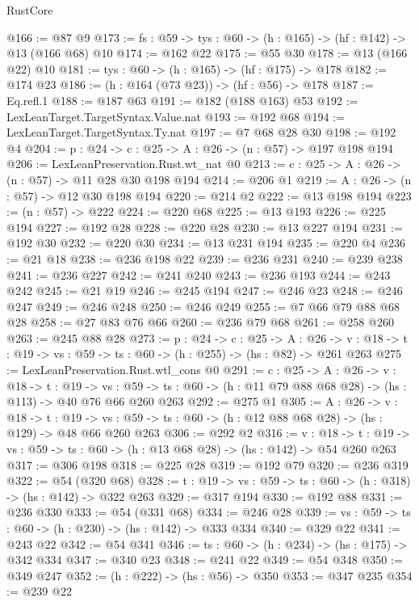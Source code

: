 \begin{lexlean}{RustCore}
\begin{coremodule}
@166 := @87 @9
@173 := {fs : @59} -> {tys : @60} -> (h : @165) -> (hf : @142) -> @13 (@166 @68) @10
@174 := @162 @22
@175 := @55 @30
@178 := @13 (@166 @22) @10
@181 := {tys : @60} -> (h : @165) -> (hf : @175) -> @178
@182 := @174 @23
@186 := (h : @164 (@73 @23)) -> (hf : @56) -> @178
@187 := Eq.refl.{1}
@188 := @187 @63
@191 := @182 (@188 @163) @53
@192 := LexLeanTarget.TargetSyntax.Value.nat
@193 := @192 @68
@194 := LexLeanTarget.TargetSyntax.Ty.nat
@197 := @7 @68 @28 @30
@198 := @192 @4
@204 := {p : @24} -> {c : @25} -> {A : @26} -> (n : @57) -> @197 @198 @194
@206 := LexLeanPreservation.Rust.wt_nat @0
@213 := {c : @25} -> {A : @26} -> (n : @57) -> @11 @28 @30 @198 @194
@214 := @206 @1
@219 := {A : @26} -> (n : @57) -> @12 @30 @198 @194
@220 := @214 @2
@222 := @13 @198 @194
@223 := (n : @57) -> @222
@224 := @220 @68
@225 := @13 @193
@226 := @225 @194
@227 := @192 @28
@228 := @220 @28
@230 := @13 @227 @194
@231 := @192 @30
@232 := @220 @30
@234 := @13 @231 @194
@235 := @220 @4
@236 := @21 @18
@238 := @236 @198 @22
@239 := @236 @231
@240 := @239 @238
@241 := @236 @227
@242 := @241 @240
@243 := @236 @193
@244 := @243 @242
@245 := @21 @19
@246 := @245 @194
@247 := @246 @23
@248 := @246 @247
@249 := @246 @248
@250 := @246 @249
@255 := @7 @66 @79 @88 @68 @28
@258 := @27 @83 @76 @66
@260 := @236 @79 @68
@261 := @258 @260
@263 := @245 @88 @28
@273 := {p : @24} ->
  {c : @25} ->
  {A : @26} ->
  {v : @18} -> {t : @19} -> {vs : @59} -> {ts : @60} -> (h : @255) -> (hs : @82) -> @261 @263
@275 := LexLeanPreservation.Rust.wtl_cons @0
@291 := {c : @25} ->
  {A : @26} ->
  {v : @18} ->
  {t : @19} ->
  {vs : @59} -> {ts : @60} -> (h : @11 @79 @88 @68 @28) -> (hs : @113) -> @40 @76 @66 @260 @263
@292 := @275 @1
@305 := {A : @26} ->
  {v : @18} ->
  {t : @19} -> {vs : @59} -> {ts : @60} -> (h : @12 @88 @68 @28) -> (hs : @129) -> @48 @66 @260 @263
@306 := @292 @2
@316 := {v : @18} ->
  {t : @19} -> {vs : @59} -> {ts : @60} -> (h : @13 @68 @28) -> (hs : @142) -> @54 @260 @263
@317 := @306 @198
@318 := @225 @28
@319 := @192 @79
@320 := @236 @319
@322 := @54 (@320 @68)
@328 := {t : @19} -> {vs : @59} -> {ts : @60} -> (h : @318) -> (hs : @142) -> @322 @263
@329 := @317 @194
@330 := @192 @88
@331 := @236 @330
@333 := @54 (@331 @68)
@334 := @246 @28
@339 := {vs : @59} -> {ts : @60} -> (h : @230) -> (hs : @142) -> @333 @334
@340 := @329 @22
@341 := @243 @22
@342 := @54 @341
@346 := {ts : @60} -> (h : @234) -> (hs : @175) -> @342 @334
@347 := @340 @23
@348 := @241 @22
@349 := @54 @348
@350 := @349 @247
@352 := (h : @222) -> (hs : @56) -> @350
@353 := @347 @235
@354 := @239 @22

\end{coremodule}
\end{lexlean}
